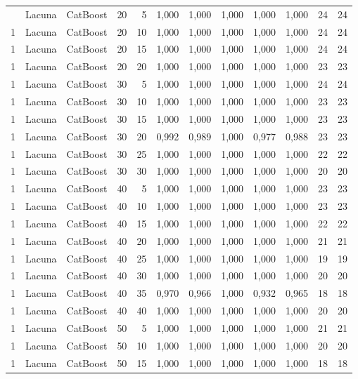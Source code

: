 \begin{longtable}{ccclrrrrrrrr}
\bottomrule
\endlastfoot
1 & Lacuna & CatBoost & 20 & 5 & 1,000 & 1,000 & 1,000 & 1,000 & 1,000 & 24 & 24 \\
1 & Lacuna & CatBoost & 20 & 10 & 1,000 & 1,000 & 1,000 & 1,000 & 1,000 & 24 & 24 \\
1 & Lacuna & CatBoost & 20 & 15 & 1,000 & 1,000 & 1,000 & 1,000 & 1,000 & 24 & 24 \\
1 & Lacuna & CatBoost & 20 & 20 & 1,000 & 1,000 & 1,000 & 1,000 & 1,000 & 23 & 23 \\
1 & Lacuna & CatBoost & 30 & 5 & 1,000 & 1,000 & 1,000 & 1,000 & 1,000 & 24 & 24 \\
1 & Lacuna & CatBoost & 30 & 10 & 1,000 & 1,000 & 1,000 & 1,000 & 1,000 & 23 & 23 \\
1 & Lacuna & CatBoost & 30 & 15 & 1,000 & 1,000 & 1,000 & 1,000 & 1,000 & 23 & 23 \\
1 & Lacuna & CatBoost & 30 & 20 & 0,992 & 0,989 & 1,000 & 0,977 & 0,988 & 23 & 23 \\
1 & Lacuna & CatBoost & 30 & 25 & 1,000 & 1,000 & 1,000 & 1,000 & 1,000 & 22 & 22 \\
1 & Lacuna & CatBoost & 30 & 30 & 1,000 & 1,000 & 1,000 & 1,000 & 1,000 & 20 & 20 \\
1 & Lacuna & CatBoost & 40 & 5 & 1,000 & 1,000 & 1,000 & 1,000 & 1,000 & 23 & 23 \\
1 & Lacuna & CatBoost & 40 & 10 & 1,000 & 1,000 & 1,000 & 1,000 & 1,000 & 23 & 23 \\
1 & Lacuna & CatBoost & 40 & 15 & 1,000 & 1,000 & 1,000 & 1,000 & 1,000 & 22 & 22 \\
1 & Lacuna & CatBoost & 40 & 20 & 1,000 & 1,000 & 1,000 & 1,000 & 1,000 & 21 & 21 \\
1 & Lacuna & CatBoost & 40 & 25 & 1,000 & 1,000 & 1,000 & 1,000 & 1,000 & 19 & 19 \\
1 & Lacuna & CatBoost & 40 & 30 & 1,000 & 1,000 & 1,000 & 1,000 & 1,000 & 20 & 20 \\
1 & Lacuna & CatBoost & 40 & 35 & 0,970 & 0,966 & 1,000 & 0,932 & 0,965 & 18 & 18 \\
1 & Lacuna & CatBoost & 40 & 40 & 1,000 & 1,000 & 1,000 & 1,000 & 1,000 & 20 & 20 \\
1 & Lacuna & CatBoost & 50 & 5 & 1,000 & 1,000 & 1,000 & 1,000 & 1,000 & 21 & 21 \\
1 & Lacuna & CatBoost & 50 & 10 & 1,000 & 1,000 & 1,000 & 1,000 & 1,000 & 20 & 20 \\
1 & Lacuna & CatBoost & 50 & 15 & 1,000 & 1,000 & 1,000 & 1,000 & 1,000 & 18 & 18 \\

\end{longtable}
